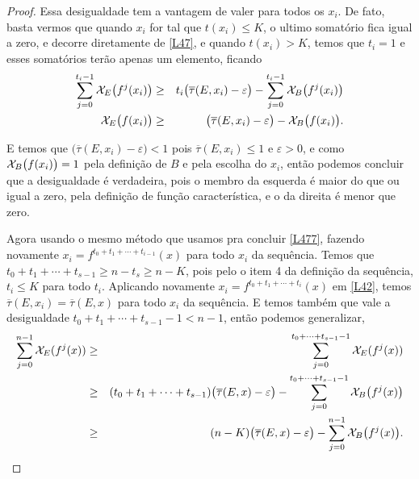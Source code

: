 \begin{proof}
Essa desigualdade tem a vantagem de valer para todos os $x_i$. De fato, basta vermos que quando $x_i$ for tal que $t(x_i)\leq K$, o ultimo somatório fica igual a zero, e decorre diretamente de \eqref{L47}, e quando $t(x_i)> K$, temos que $t_{i}=1$ e esses somatórios terão apenas um elemento, ficando
\begin{eqnarray*}
\sum_{j=0}^{t_i-1}\mathcal{X}_{E}\big(f^j(x_i)\big) & \geq & t_i\big(\overline{\tau}(E,x_i)-\varepsilon\big)-\sum_{j=0}^{t_i-1}\mathcal{X}_{B}\big(f^j(x_i)\big)\\
\mathcal{X}_{E}\big(f(x_i)\big) & \geq & \big(\overline{\tau}(E,x_i)-\varepsilon\big)-\mathcal{X}_{B}\big(f(x_i)\big).
\end{eqnarray*}

E temos que $\big(\overline{\tau}(E,x_i)-\varepsilon\big)<1$ pois $\overline{\tau}(E,x_i)\leq1$ e $\varepsilon>0$, e como $\mathcal{X}_{B}\big(f(x_i)\big)=1$ pela definição de $B$ e pela escolha do $x_i$, então podemos concluir que a desigualdade é verdadeira, pois o membro da esquerda é maior do que ou igual a zero, pela definição de função característica, e o da direita é menor que zero.

Agora usando o mesmo método que usamos pra concluir \eqref{L477}, fazendo novamente $x_i = f^{t_0+t_1+\cdots+t_{i-1}}(x)$ para todo $x_i$ da sequência. Temos que $t_0+t_1+\cdots+t_{s-1}\geq n-t_s \geq n-K$, pois pelo o item 4 da definição da sequência, $t_i\leq K$ para todo $t_i$. Aplicando novamente $x_i=f^{t_0+t_1+\cdots+t_{i}}(x)$ em \eqref{L42}, temos $\overline{\tau}(E,x_i)=\overline{\tau}(E,x)$ para todo $x_i$ da sequência. E temos também que vale a desigualdade $t_0+t_1+\cdots+t_{s-1}-1< n-1$, então podemos generalizar,
\begin{eqnarray*}
\sum_{j=0}^{n-1}\mathcal{X}_{E}(f^j(x)) & \geq & \sum_{j=0}^{t_0+\cdots+t_{s-1}-1}\mathcal{X}_{E}(f^j(x))\nonumber\\
 & \geq & (t_0+t_1+\cdots+t_{s-1})\big(\overline{\tau}(E,x)-\varepsilon\big)-\sum_{j=0}^{t_0+\cdots+t_{s-1}-1}\mathcal{X}_{B}\big(f^j(x)\big)\\
 & \geq & (n-K)\big(\overline{\tau}(E,x)-\varepsilon\big)-\sum_{j=0}^{n-1}\mathcal{X}_{B}\big(f^j(x)\big).\\
\end{eqnarray*}


\end{proof}
